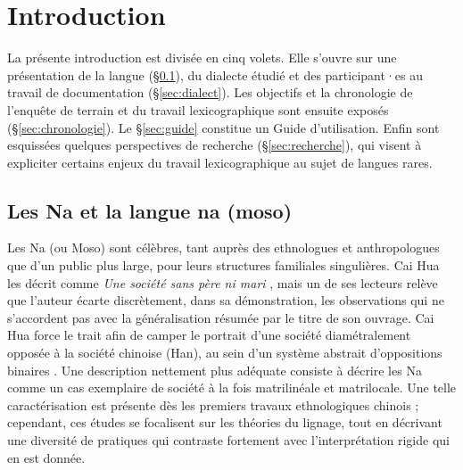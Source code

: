 
\languefra

\chapter*{Introduction}

La présente introduction est divisée en cinq volets. Elle s'ouvre sur une présentation de la langue (§\ref{sec:lang}), du dialecte étudié et des participant·es au travail de documentation (§\ref{sec:dialect}). Les objectifs et la chronologie de l'enquête de terrain et du travail lexicographique sont ensuite exposés (§\ref{sec:chronologie}). Le §\ref{sec:guide} constitue un Guide d'utilisation. Enfin sont esquissées quelques perspectives de recherche (§\ref{sec:recherche}), qui visent à expliciter certains enjeux du travail lexicographique au sujet de langues rares.


\section{Les Na et la langue na (moso)}
\label{sec:lang}

Les Na (ou Moso) sont célèbres, tant auprès des ethnologues et anthropologues que d’un public plus large, pour leurs structures familiales singulières. Cai Hua les décrit comme \emph{Une société sans père ni mari} \parencite{cai1997}, mais un de ses lecteurs \parencite[147]{wellens2003} relève que l'auteur écarte discrètement, dans sa démonstration, les observations qui ne s'accordent pas avec la généralisation résumée par le titre de son ouvrage. Cai Hua force le trait afin de camper le portrait d'une société diamétralement opposée à la société chinoise (Han), au sein d'un système abstrait d'oppositions binaires \parencite{cai2008}. Une description nettement plus adéquate consiste à décrire les Na comme un cas exemplaire de société à la fois matrilinéale et matrilocale. Une telle caractérisation est présente dès les premiers travaux ethnologiques chinois \parencite{zhanetal1980,yanetal1983,weng1993,shih1993,shih2010}; cependant, ces études se focalisent sur les théories du lignage, tout en décrivant une diversité de pratiques qui contraste fortement avec l'interprétation rigide qui en est donnée.

